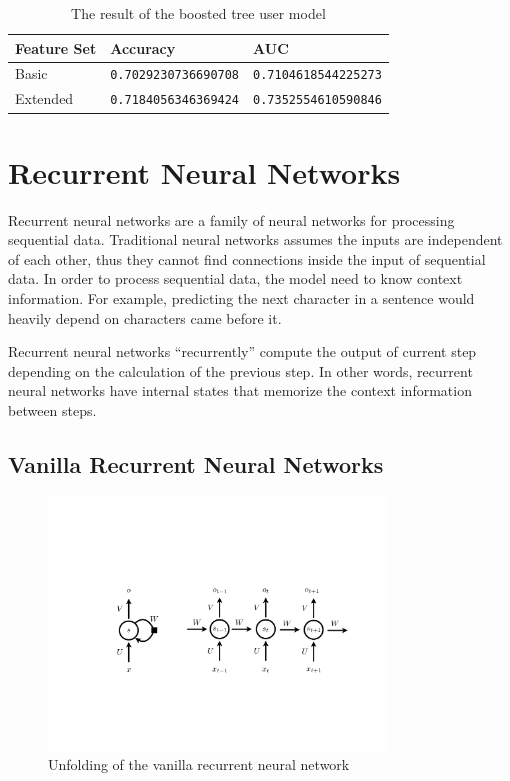         \begin{table}[hpbt]
        \centering
        \begin{tabular}{lll}
            \hline
            Feature Set & Accuracy & AUC \\
            \hline
            Basic    & \verb|0.7029230736690708| & \verb|0.7104618544225273| \\
            Extended & \verb|0.7184056346369424| & \verb|0.7352554610590846| \\
            \hline
        \end{tabular}
        \caption{The result of the boosted tree user model}
        \label{table:xgboost result}
        \end{table}

\section{Recurrent Neural Networks}

    Recurrent neural networks are a family of neural networks for processing sequential data.
    Traditional neural networks assumes the inputs are independent of each other,
    thus they cannot find connections inside the input of sequential data.
    In order to process sequential data, the model need to know context information.
    For example, predicting the next character in a sentence would heavily depend on
    characters came before it.

    Recurrent neural networks ``recurrently'' compute the output of current step
    depending on the calculation of the previous step.
    In other words, recurrent neural networks have internal states
    that memorize the context information between steps.

    \subsection{Vanilla Recurrent Neural Networks}

        \begin{figure}[!htp]
            \centering
            \includegraphics[width=0.8\textwidth]{img/rnn.pdf}
            \caption{Unfolding of the vanilla recurrent neural network}
            \label{fig:rnn}
        \end{figure}

